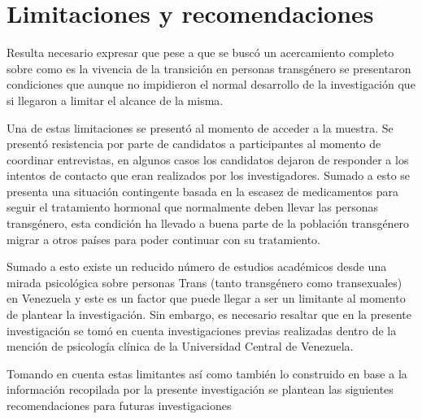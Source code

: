 \section{Limitaciones y recomendaciones}

Resulta necesario expresar que pese a que se buscó un acercamiento completo
sobre como es la vivencia de la transición en personas transgénero se
presentaron condiciones que aunque no impidieron el normal desarrollo de la
investigación que si llegaron a limitar el alcance de la misma.

Una de estas limitaciones se presentó al momento de acceder a la muestra. Se
presentó resistencia por parte de candidatos a participantes al momento de
coordinar entrevistas, en algunos casos los candidatos dejaron de responder a
los intentos de contacto que eran realizados por los investigadores. Sumado a
esto se presenta una situación contingente basada en la escasez de medicamentos
para seguir el tratamiento hormonal que normalmente deben llevar las personas
transgénero, esta condición ha llevado a buena parte de la población transgénero
migrar a otros países para poder continuar con su tratamiento.

Sumado a esto existe un reducido número de estudios académicos desde una mirada
psicológica sobre personas Trans (tanto transgénero como transexuales) en
Venezuela y este es un factor que puede llegar a ser un limitante al momento de
plantear la investigación. Sin embargo, es necesario resaltar que en la presente
investigación se tomó en cuenta investigaciones previas realizadas dentro de
la mención de psicología clínica de la Universidad Central de Venezuela.

Tomando en cuenta estas limitantes así como también lo construido en base a la
información recopilada por la presente investigación se plantean las siguientes
recomendaciones para futuras investigaciones

